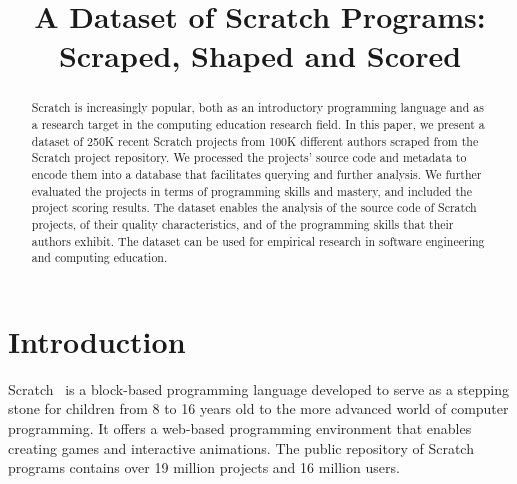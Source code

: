 \documentclass[10pt, conference]{IEEEtran}
\begin{document}
\title{A Dataset of Scratch Programs:\\Scraped, Shaped and Scored}

\author{
}

\maketitle


\begin{abstract}
Scratch is increasingly popular, both as an introductory programming language and as a research target in the computing education research field.	
In this paper, we present a dataset of 250K recent Scratch projects from 100K different authors scraped from the Scratch project repository.
We processed the projects' source code and metadata to encode them into a database that facilitates querying and further analysis. We further evaluated the projects in terms of programming skills and mastery, and included the project scoring results.
The dataset enables the analysis of the source code of Scratch projects, of their quality characteristics, and of the programming skills that their authors exhibit.
The dataset can be used for empirical research in software engineering and computing education.
\end{abstract}
 
\section{Introduction}
Scratch~\cite{resnick_scratch:_2009} is a block-based programming language developed to serve as a stepping stone for children from 8 to 16 years old to the more advanced world of computer programming.
It offers a web-based programming environment that enables creating games and interactive animations. The public repository of Scratch programs contains over 19 million projects and 16 million users.
\end{document}
